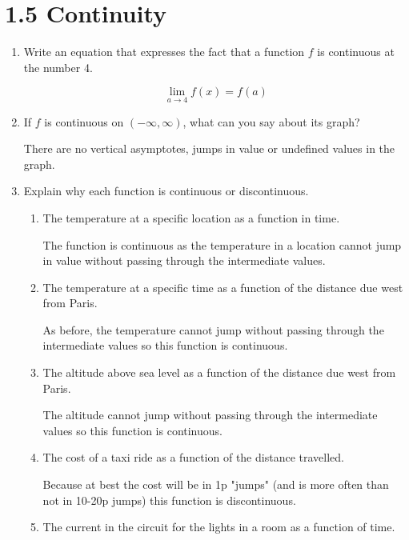\documentclass{article}
\begin{document}
	\section{1.5 Continuity}

	\begin{enumerate}
		\item Write an equation that expresses the fact that a function $f$
			is continuous at the number 4.

			$$\lim \limits _{a \to 4} f(x) = f(a)$$

		\item If $f$ is continuous on $(-\infty, \infty)$, what can you
			say about its graph?

			There are no vertical asymptotes, jumps in value or
			undefined values in the graph.

		\item Explain why each function is continuous or discontinuous.

			\begin{enumerate}
				\item The temperature at a specific location as
					a function in time.

					The function is continuous as the temperature
					in a location cannot jump in value without passing
					through the intermediate values.

				\item The temperature at a specific time as a function of
					the distance due west from Paris.

					As before, the temperature cannot jump without passing
					through the intermediate values so this function is
					continuous.

				\item The altitude above sea level as a function of the distance
					due west from Paris.

					The altitude cannot jump without passing through the 
					intermediate values so this function is continuous.

				\item The cost of a taxi ride as a function of the distance travelled.

					Because at best the cost will be in 1p "jumps" (and is more often
					than not in 10-20p jumps) this function is discontinuous.

				\item The current in the circuit for the lights in a room as a function of
					time.


\end{enumerate}
\end{enumerate}
\end{document}
